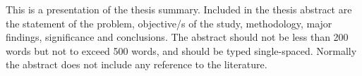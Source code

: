     This is a presentation of the thesis summary. Included in the thesis abstract are the statement of the problem, objective/s of the study, methodology, major findings, significance and conclusions. The abstract should not be less than 200 words but not to exceed 500 words, and should be typed single-spaced. Normally the abstract does not include any reference to the literature.